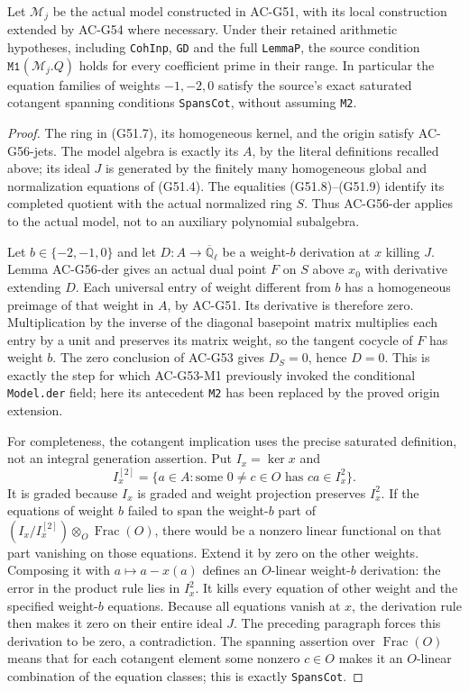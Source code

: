 \begin{theorem}
\label{AC-G56}
Let $\mathcal M_j$ be the actual model constructed
in AC-G51, with its local construction extended
by AC-G54 where necessary.
Under their retained arithmetic hypotheses,
including \texttt{CohInp}, \texttt{GD} and the
full \texttt{LemmaP}, the source condition
$\texttt{M1}(\mathcal M_j.Q)$ holds for every
coefficient prime in their range.
In particular the equation families of weights
$-1,-2,0$ satisfy the source's exact saturated
cotangent spanning conditions
\texttt{SpansCot}, without assuming \texttt{M2}.
\end{theorem}
\begin{proof}
The ring in (G51.7), its homogeneous kernel,
and the origin satisfy AC-G56-jets.
The model algebra is exactly its $A$, by the
literal definitions recalled above; its ideal
$J$ is generated by the finitely many homogeneous
global and normalization equations of (G51.4).
The equalities (G51.8)--(G51.9) identify its
completed quotient with the actual normalized
ring $S$.  Thus AC-G56-der applies to the actual
model, not to an auxiliary polynomial subalgebra.

Let $b\in\{-2,-1,0\}$ and let $D:A\to
\overline{\mathbb Q}_\ell$ be a weight-$b$
derivation at $x$ killing $J$.
Lemma AC-G56-der gives an actual dual point
$F$ on $S$ above $x_0$ with derivative extending
$D$.
Each universal entry of weight different from
$b$ has a homogeneous preimage of that weight
in $A$, by AC-G51.
Its derivative is therefore zero.
Multiplication by the inverse of the diagonal
basepoint matrix multiplies each entry by a
unit and preserves its matrix weight, so the
tangent cocycle of $F$ has weight $b$.
The zero conclusion of AC-G53 gives
$D_S=0$, hence $D=0$.
This is exactly the step for which AC-G53-M1
previously invoked the conditional
\texttt{Model.der} field; here its antecedent
\texttt{M2} has been replaced by the proved
origin extension.

For completeness, the cotangent implication uses
the precise saturated definition, not an integral
generation assertion.  Put $I_x=\ker x$ and
\[
 I_x^{[2]}=\{a\in A:\text{some }0\ne c\in O
                              \text{ has }ca\in I_x^2\}.
                                                               \tag{G56.13}
\]
It is graded because $I_x$ is graded and weight
projection preserves $I_x^2$.
If the equations of weight $b$ failed to span
the weight-$b$ part of
$(I_x/I_x^{[2]})\otimes_O\operatorname{Frac}(O)$,
there would be a nonzero linear functional on
that part vanishing on those equations.
Extend it by zero on the other weights.
Composing it with
$a\mapsto a-x(a)$ defines an $O$-linear
weight-$b$ derivation: the error in the product
rule lies in $I_x^2$.
It kills every equation of other weight and
the specified weight-$b$ equations.  Because
all equations vanish at $x$, the derivation
rule then makes it zero on their entire ideal
$J$.  The preceding paragraph forces this
derivation to be zero, a contradiction.
The spanning assertion over
$\operatorname{Frac}(O)$ means that for each
cotangent element some nonzero $c\in O$
makes it an $O$-linear combination of the
equation classes; this is exactly
\texttt{SpansCot}.


\end{proof}
